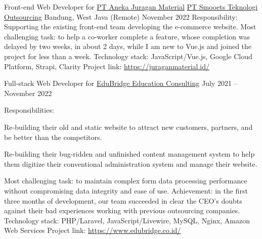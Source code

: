 


\begin{cventries}


\cventry
{Front-end Web Developer for \href{https://juraganmaterial.id/}{PT Aneka Juragan Material}} %
{\href{https://www.smooets.com/}{PT Smooets Teknologi Outsourcing}} %
{Bandung, West Java (Remote)} %
{November 2022} %
{ %
Responsibility: Supporting the existing front-end team developing the e-commerce website.
\linebreak
Most challenging task: to help a co-worker complete a feature, whose completion was delayed by two weeks, in about 2 days, while I am new to Vue.js and joined the project for less than a week.
\linebreak
Technology stack: JavaScript/Vue.js, Google Cloud Platform, Strapi, Clarity
\linebreak
Project link: \href{https://juraganmaterial.id/}{https://juraganmaterial.id/}
}


\cventry
{Full-stack Web Developer for \href{https://www.edubridge.co.id/}{EduBridge Education Consulting}} %
{} %
{} %
{July 2021 -- November 2022} %
{ %
Responsibilities:
\vspace{5mm}
\begin{cvitems}
\item {Re-building their old and static website to attract new customers, partners, and be better than the competitors.}
\item {Re-building their bug-ridden and unfinished content management system to help them digitize their conventional administration system and manage their website.}
\end{cvitems}
\vspace{4mm}
Most challenging task: to maintain complex form data processing performance without compromising data integrity and ease of use.
\linebreak
Achievement: in the first three months of development, our team succeeded in clear the CEO's doubts against their bad experiences working with previous outsourcing companies.
\linebreak
Technology stack: PHP/Laravel, JavaScript/Livewire, MySQL, Nginx, Amazon Web Services
\linebreak
Project link: \href{https://www.edubridge.co.id/}{https://www.edubridge.co.id/}
}


\end{cventries}
